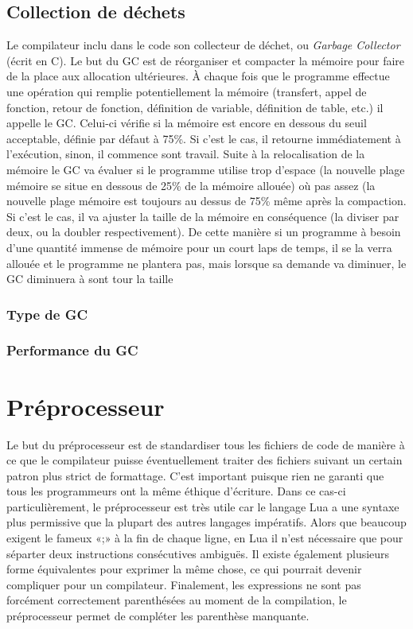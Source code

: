 \documentclass{article}
\begin{document}
\subsection{Collection de déchets}
Le compilateur inclu dans le code son collecteur de déchet, ou \textit{Garbage Collector} (écrit en C). Le but du GC est de réorganiser et compacter la mémoire pour faire de la place aux allocation ultérieures. À chaque fois que le programme effectue une opération qui remplie potentiellement la mémoire (transfert, appel de fonction, retour de fonction, définition de variable, définition de table, etc.) il appelle le GC. Celui-ci vérifie si la mémoire est encore en dessous du seuil acceptable, définie par défaut à 75\%{}. Si c'est le cas, il retourne immédiatement à l'exécution, sinon, il commence sont travail. Suite à la relocalisation de la mémoire le GC va évaluer si le programme utilise trop d'espace (la nouvelle plage mémoire se situe en dessous de 25\%{} de la mémoire allouée) où pas assez (la nouvelle plage mémoire est toujours au dessus de 75\%{} même après la compaction. Si c'est le cas, il va ajuster la taille de la mémoire en conséquence (la diviser par deux, ou la doubler respectivement). De cette manière si un programme à besoin d'une quantité immense de mémoire pour un court laps de temps, il se la verra allouée et le programme ne plantera pas, mais lorsque sa demande va diminuer, le GC diminuera à sont tour la taille 

\subsubsection{Type de GC}

\subsubsection{Performance du GC}

\newpage
\section{Préprocesseur}
Le but du préprocesseur est de standardiser tous les fichiers de code de manière à ce que le compilateur puisse éventuellement traiter des fichiers suivant un certain patron plus strict de formattage. C'est important puisque rien ne garanti que tous les programmeurs ont la même éthique d'écriture. Dans ce cas-ci particulièrement, le préprocesseur est très utile car le langage Lua a une syntaxe plus permissive que la plupart des autres langages impératifs. Alors que beaucoup exigent le fameux «;» à la fin de chaque ligne, en Lua il n'est nécessaire que pour séparter deux instructions consécutives ambiguës. Il existe également plusieurs forme équivalentes pour exprimer la même chose, ce qui pourrait devenir compliquer pour un compilateur. Finalement, les expressions ne sont pas forcément correctement parenthésées au moment de la compilation, le préprocesseur permet de compléter les parenthèse manquante.
\end{document}
